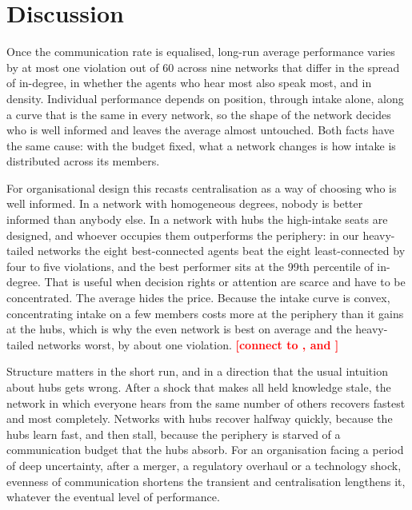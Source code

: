 \documentclass[11pt]{article}
\newcommand{\todo}[1]{\textcolor{red}{\textbf{[#1]}}}
\begin{document}
\section{Discussion}\label{sec:discussion}

Once the communication rate is equalised, long-run average performance varies by at most one violation out of 60 across nine networks that differ in the spread of in-degree, in whether the agents who hear most also speak most, and in density. Individual performance depends on position, through intake alone, along a curve that is the same in every network, so the shape of the network decides who is well informed and leaves the average almost untouched. Both facts have the same cause: with the budget fixed, what a network changes is how intake is distributed across its members.

For organisational design this recasts centralisation as a way of choosing who is well informed. In a network with homogeneous degrees, nobody is better informed than anybody else. In a network with hubs the high-intake seats are designed, and whoever occupies them outperforms the periphery: in our heavy-tailed networks the eight best-connected agents beat the eight least-connected by four to five violations, and the best performer sits at the 99th percentile of in-degree. That is useful when decision rights or attention are scarce and have to be concentrated. The average hides the price. Because the intake curve is convex, concentrating intake on a few members costs more at the periphery than it gains at the hubs, which is why the even network is best on average and the heavy-tailed networks worst, by about one violation. \todo{connect to \textcite{simon1962architecture}, \textcite{bolton1994firm} and \textcite{lazer2007network}}

Structure matters in the short run, and in a direction that the usual intuition about hubs gets wrong. After a shock that makes all held knowledge stale, the network in which everyone hears from the same number of others recovers fastest and most completely. Networks with hubs recover halfway quickly, because the hubs learn fast, and then stall, because the periphery is starved of a communication budget that the hubs absorb. For an organisation facing a period of deep uncertainty, after a merger, a regulatory overhaul or a technology shock, evenness of communication shortens the transient and centralisation lengthens it, whatever the eventual level of performance.
\end{document}
